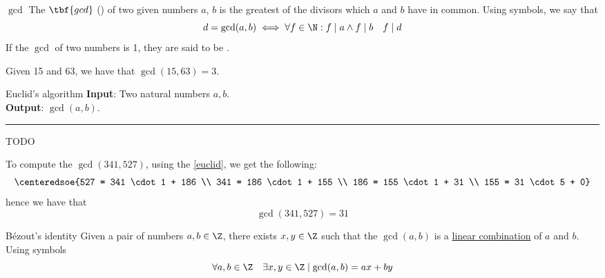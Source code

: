 \documentclass[a4paper, 12pt]{report}
\begin{document}
    \begin{frameddefn}[label={gcd}]{$\gcd$}
        The $\tbf{gcd}$ () of two given numbers $a$, $b$ is the greatest of the divisors which $a$ and $b$ have in common. Using symbols, we say that $$d = \gcd(a, b) \iff \forall f \in \N : f \mid a \land f \mid b \quad f \mid d$$ If the $\gcd$ of two numbers is 1, they are said to be .
    \end{frameddefn}

    \begin{example}[$\gcd$]
        Given 15 and 63, we have that $\gcd(15, 63) = 3$.
    \end{example}

    \begin{framedalgo}[label={euclid}]{Euclid's algorithm}
        \textbf{Input}: Two natural numbers $a, b$.\\
        \textbf{Output}: $\gcd(a, b)$.

        \hrule
        \begin{algorithmic}[1]
                \State TODO
            \EndFunction
        \end{algorithmic}
    \end{framedalgo}


    \begin{example}
        \label{euclid example}
        To compute the $\gcd(341, 527)$, using the \cref{euclid}, we get the following: $$\centeredsoe{527 = 341 \cdot 1 + 186 \\ 341 = 186 \cdot 1 + 155 \\ 186 = 155 \cdot 1 + 31 \\ 155 = 31 \cdot 5 + 0}$$ hence we have that $$\gcd(341, 527) = 31$$
    \end{example}

    \begin{framedlem}[label={bezout}]{Bézout's identity}
        Given a pair of numbers $a, b \in \Z$, there exists $x, y \in \Z$ such that the $\gcd(a, b)$ is a \href{https://en.wikipedia.org/wiki/Linear_combination}{linear combination} of $a$ and $b$. Using symbols $$\forall a, b \in \Z \quad \exists x, y \in \Z \mid \gcd(a, b) = ax + by$$
    \end{framedlem}
\end{document}

